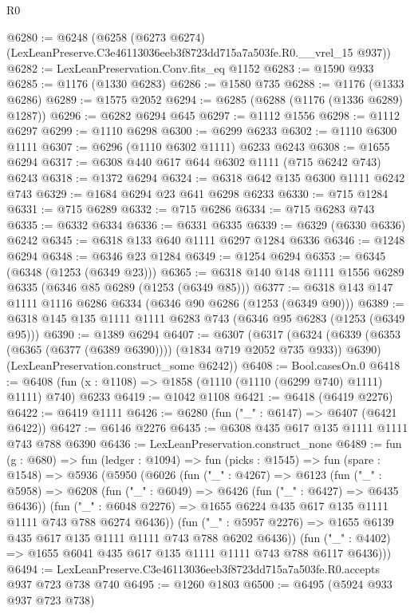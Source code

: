 \begin{lexlean}{R0}
\begin{coremodule}
@6280 := @6248
    (@6258 (@6273 @6274) (LexLeanPreserve.C3e46113036eeb3f8723dd715a7a503fe.R0.__vrel_15 @937))
@6282 := LexLeanPreservation.Conv.fits_eq @1152
@6283 := @1590 @933
@6285 := @1176 (@1330 @6283)
@6286 := @1580 @735
@6288 := @1176 (@1333 @6286)
@6289 := @1575 @2052
@6294 := @6285 (@6288 (@1176 (@1336 @6289) @1287))
@6296 := @6282 @6294 @645
@6297 := @1112 @1556
@6298 := @1112 @6297
@6299 := @1110 @6298
@6300 := @6299 @6233
@6302 := @1110 @6300 @1111
@6307 := @6296 (@1110 @6302 @1111) @6233 @6243
@6308 := @1655 @6294
@6317 := @6308 @440 @617 @644 @6302 @1111 (@715 @6242 @743) @6243
@6318 := @1372 @6294
@6324 := @6318 @642 @135 @6300 @1111 @6242 @743
@6329 := @1684 @6294 @23 @641 @6298 @6233
@6330 := @715 @1284
@6331 := @715 @6289
@6332 := @715 @6286
@6334 := @715 @6283 @743
@6335 := @6332 @6334
@6336 := @6331 @6335
@6339 := @6329 (@6330 @6336) @6242
@6345 := @6318 @133 @640 @1111 @6297 @1284 @6336
@6346 := @1248 @6294
@6348 := @6346 @23 @1284
@6349 := @1254 @6294
@6353 := @6345 (@6348 (@1253 (@6349 @23)))
@6365 := @6318 @140 @148 @1111 @1556 @6289 @6335 (@6346 @85 @6289 (@1253 (@6349 @85)))
@6377 := @6318 @143 @147 @1111 @1116 @6286 @6334 (@6346 @90 @6286 (@1253 (@6349 @90)))
@6389 := @6318 @145 @135 @1111 @1111 @6283 @743 (@6346 @95 @6283 (@1253 (@6349 @95)))
@6390 := @1389 @6294
@6407 := @6307
    (@6317
      (@6324 (@6339 (@6353 (@6365 (@6377 (@6389 @6390)))) (@1834 @719 @2052 @735 @933)) @6390)
      (LexLeanPreservation.construct_some @6242))
@6408 := Bool.casesOn.{0}
@6418 := @6408 (fun (x : @1108) => @1858 (@1110 (@1110 (@6299 @740) @1111) @1111) @740) @6233
@6419 := @1042 @1108
@6421 := @6418 (@6419 @2276)
@6422 := @6419 @1111
@6426 := @6280 (fun ("_" : @6147) => @6407 (@6421 @6422))
@6427 := @6146 @2276
@6435 := @6308 @435 @617 @135 @1111 @1111 @743 @788 @6390
@6436 := LexLeanPreservation.construct_none
@6489 := fun (g : @680) =>
  fun (ledger : @1094) =>
  fun (picks : @1545) =>
  fun (spare : @1548) =>
  @5936
    (@5950
      (@6026
        (fun ("_" : @4267) =>
        @6123
          (fun ("_" : @5958) =>
          @6208
            (fun ("_" : @6049) => @6426 (fun ("_" : @6427) => @6435 @6436))
            (fun ("_" : @6048 @2276) =>
            @1655 @6224 @435 @617 @135 @1111 @1111 @743 @788 @6274 @6436))
          (fun ("_" : @5957 @2276) => @1655 @6139 @435 @617 @135 @1111 @1111 @743 @788 @6202 @6436))
        (fun ("_" : @4402) => @1655 @6041 @435 @617 @135 @1111 @1111 @743 @788 @6117 @6436)))
@6494 := LexLeanPreserve.C3e46113036eeb3f8723dd715a7a503fe.R0.accepts @937 @723 @738 @740
@6495 := @1260 @1803
@6500 := @6495 (@5924 @933 @937 @723 @738)

\end{coremodule}
\end{lexlean}
